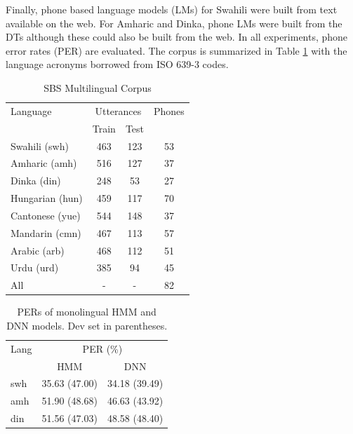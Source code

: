 \documentclass[a4paper]{article}
\begin{document}
Finally, phone based language models (LMs) for Swahili were built from text available on the web. For Amharic and Dinka, phone LMs were built from the DTs although these could also be built from the web. In all experiments, phone error rates (PER) are evaluated. The corpus is summarized in Table \ref{Tab:SBS Corpus} with the language acronyms borrowed from  ISO 639-3 codes.
\begin{table}
\begin{center}
\caption{SBS Multilingual Corpus}
\label{Tab:SBS Corpus}
\begin{tabular}{l|c c| c}
   \hline
Language &  \multicolumn{2}{c|}{Utterances}  & Phones \\ 
                 &  Train & Test &  \\ \hline
Swahili (swh)     & 463 & 123 & 53 \\
Amharic (amh)     & 516 & 127 & 37 \\
Dinka   (din)     & 248 &  53 & 27 \\ 
Hungarian (hun)    & 459 & 117 & 70 \\ 
Cantonese (yue)  & 544 & 148 &  37 \\ 
Mandarin (cmn) & 467 & 113 &  57 \\ 
Arabic (arb) & 468 & 112 &  51 \\ 
Urdu (urd) & 385 & 94 &  45 \\ \hline
All & - & - & 82 \\ \hline
\end{tabular}
\vspace{-5mm}
\end{center}
\end{table}

\begin{table}
\centering %
\caption{PERs of monolingual HMM and DNN models. Dev set in parentheses.}
\begin{tabular}{l|c c}
   \hline
Lang  & \multicolumn{2}{c}{PER (\%)} \\
          & HMM     & DNN   \\ \hline
swh        & 35.63 (47.00)   & 34.18 (39.49)   \\
amh        & 51.90 (48.68)   & 46.63 (43.92)   \\ 
din        & 51.56 (47.03)   & 48.58 (48.40)  \\ \hline 
\end{tabular}
\vspace{-5mm}
\label{Tab:PER_Matched_Monolingual}
\end{table}
\end{document}
